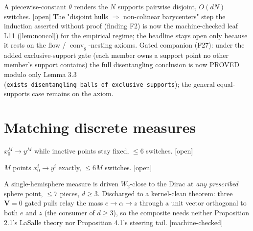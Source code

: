\begin{proposition}[Disentanglement, 3.1]\label{prop:31}
A piecewise-constant $\theta$ renders the $N$ supports pairwise disjoint, $O(dN)$ switches. [open]
The "disjoint hulls $\Rightarrow$ non-colinear barycenters" step the induction asserted without proof
(finding F2) is now the machine-checked leaf L11 (\ref{lem:noncol}) for the empirical regime; the
headline stays open only because it rests on the flow / $\operatorname{conv}_g$-nesting axioms.
Gated companion (F27): under the added exclusive-support gate (each member owns a support point no
other member's support contains) the full disentangling conclusion is now PROVED modulo only
Lemma 3.3 (\texttt{exists\_disentangling\_balls\_of\_exclusive\_supports}); the general
equal-supports case remains on the axiom.
\end{proposition}

\section{Matching discrete measures}

\begin{proposition}\label{prop:42}
$x_0^M\to y^M$ while inactive points stay fixed, $\le 6$ switches. [open]
\end{proposition}

\begin{proposition}\label{prop:41}
$M$ points $x_0^i\to y^i$ exactly, $\le 6M$ switches. [open]
\end{proposition}

\begin{proposition}\label{prop:c2p}\leanok
A single-hemisphere measure is driven $W_2$-close to the Dirac at \emph{any prescribed} sphere
point, $\le 7$ pieces, $d\ge 3$. Discharged to a kernel-clean theorem: three $\mathbf V=0$ gated
pulls relay the mass $e\to\alpha\to z$ through a unit vector orthogonal to both $e$ and $z$ (the
consumer of $d\ge 3$), so the composite needs neither Proposition 2.1's LaSalle theory nor
Proposition 4.1's steering tail. [machine-checked]
\end{proposition}

